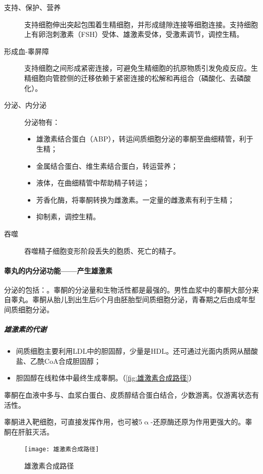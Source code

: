 \begin{description}
	\item[支持、保护、营养] 支持细胞伸出突起包围着生精细胞，并形成缝隙连接等细胞连接。支持细胞上有卵泡刺激素（FSH）受体、雄激素受体，受激素调节，调控生精。
	\item[形成血-睾屏障] 支持细胞之间形成紧密连接，可避免生精细胞的抗原物质引发免疫反应。生精细胞向管腔侧的迁移依赖于紧密连接的松解和再组合（磷酸化、去磷酸化）。
	\item[分泌、内分泌] 分泌物有：\begin{itemize}
		\item 雄激素结合蛋白（ABP），转运间质细胞分泌的睾酮至曲细精管，利于生精；
		\item 金属结合蛋白、维生素结合蛋白，转运营养；
		\item 液体，在曲细精管中帮助精子转运；
		\item 芳香化酶，将睾酮转换为雌激素。一定量的雌激素有利于生精；
		\item 抑制素，调控生精。
	\end{itemize}
	\item[吞噬] 吞噬精子细胞变形阶段丢失的胞质、死亡的精子。
\end{description}

\paragraph{睾丸的内分泌功能——产生雄激素}

分泌的包括：。睾酮的分泌量和生物活性都是最强的。男性血浆中的睾酮大部分来自睾丸。睾酮从胎儿到出生后6个月由胚胎型间质细胞分泌，青春期之后由成年型间质细胞分泌。

\subparagraph{雄激素的代谢}

\begin{itemize}
	\item 间质细胞主要利用LDL中的胆固醇，少量是HDL。还可通过光面内质网从醋酸盐、乙酰CoA合成胆固醇；
	\item 胆固醇在线粒体中最终生成睾酮。（\autoref{fig:雄激素合成路径}）
\end{itemize}

睾酮在血液中多与、血浆白蛋白、皮质醇结合蛋白结合，少数游离。仅游离状态有活性。

睾酮进入靶细胞，可直接发挥作用，也可被5$\upalpha$-还原酶还原为作用更强大的。睾酮在肝脏灭活。

\begin{figure}[htbp]
	\centering
	\texttt{[image: 雄激素合成路径]}
	\caption{雄激素合成路径}
	\label{fig:雄激素合成路径}
\end{figure}

